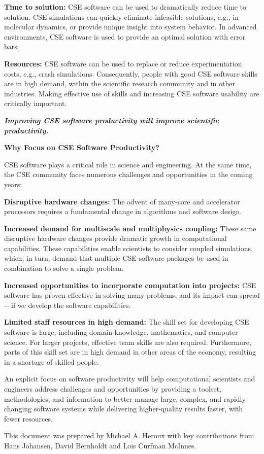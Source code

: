 \documentclass[]{article}
\begin{document}
\textbf{Time to solution:} CSE software can be used to dramatically
reduce time to solution. CSE simulations can quickly eliminate
infeasible solutions, e.g., in molecular dynamics, or provide unique
insight into system behavior. In advanced environments, CSE software is
used to provide an optimal solution with error bars.

\textbf{Resources:} CSE software can be used to replace or reduce
experimentation costs, e.g., crash simulations. Consequently, people
with good CSE software skills are in high demand, within the scientific
research community and in other industries. Making effective use of
skills and increasing CSE software usability are critically important.

\emph{\textbf{Improving CSE software productivity will improve
scientific productivity.}}

\textbf{Why Focus on CSE Software
Productivity?}

CSE software plays a critical role in science and engineering. At the
same time, the CSE community faces numerous challenges and opportunities
in the coming years:

\textbf{Disruptive hardware changes:} The advent of many-core and
accelerator processors requires a fundamental change in algorithms and
software design.

\textbf{Increased demand for multiscale and multiphysics coupling:}
These same disruptive hardware changes provide dramatic growth in
computational capabilities. These capabilities enable scientists to
consider coupled simulations, which, in turn, demand that multiple CSE
software packages be used in combination to solve a single problem.

\textbf{Increased opportunities to incorporate computation into
projects:} CSE software has proven effective in solving many problems,
and its impact can spread -\/- if we develop the software capabilities.

\textbf{Limited staff resources in high demand:} The skill set for
developing CSE software is large, including domain knowledge,
mathematics, and computer science. For larger projects, effective team
skills are also required. Furthermore, parts of this skill set are in
high demand in other areas of the economy, resulting in a shortage of
skilled people.

An explicit focus on software productivity will help computational
scientists and engineers address challenges and opportunities by
providing a toolset, methodologies, and information to better manage
large, complex, and rapidly changing software systems while delivering
higher-quality results faster, with fewer resources.

This document was prepared by Michael A. Heroux with key contributions
from Hans Johansen, David Bernholdt and Lois Curfman McInnes.
\end{document}
